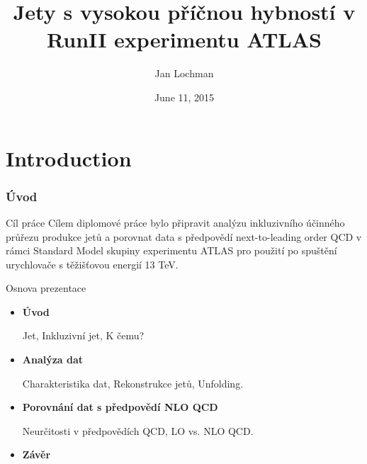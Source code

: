 \documentclass[compress]{beamer}
\title[High $\pt$ jets]{Jety s vysokou p\v{r}\'{i}\v{c}nou hybnost\'{i} v RunII
experimentu ATLAS}
\author{Jan Lochman}
\institute[FNSPE CTU] 
{
  Vedouc\'{i} pr\'{a}ce: Ing. Zden\v{e}k Hub\'{a}\v{c}ek, Ph.D.

  \medskip
  \medskip
  \medskip
  \large
  Obhajoba diplomov\'{e} pr\'{a}ce \\ 
  \medskip
}
\date{June 11, 2015}
\begin{document}

\begin{frame}
\titlepage 
\end{frame}

\section{Introduction}

\begin{frame}
\frametitle{\'{U}vod}
\begin{block}{C\'{i}l pr\'{a}ce}
  C\'{i}lem diplomov\'{e} pr\'{a}ce bylo p\v{r}ipravit anal\'{y}zu
  inkluzivn\'{i}ho
  \'{u}\v{c}inn\'{e}ho pr\r{u}\v{r}ezu
  produkce jet\r{u} a porovnat data s p\v{r}edpov\v{e}d\'{i} next-to-leading order
  QCD v r\'{a}mci
  Standard Model skupiny experimentu ATLAS pro pou\v{z}it\'{i} po
  spu\v{s}t\v{e}n\'{i} urychlova\v{c}e s
  t\v{e}\v{z}i\v{s}\v{t}ovou energi\'{i} 13 TeV.
\end{block}
\begin{block}{Osnova prezentace}
\begin{itemize}
  \item \textbf{\'{U}vod} 

    Jet, Inkluzivn\'{i} jet, K \v{c}emu?
  \item \textbf{Anal\'{y}za dat}

    Charakteristika dat, Rekonstrukce jet\r{u}, Unfolding.
  \item \textbf{Porovn\'{a}n\'{i} dat s p\v{r}edpov\v{e}d\'{i} NLO QCD}

    Neur\v{c}itosti v p\v{r}edpov\v{e}d\'{i}ch QCD, LO vs. NLO QCD.

  \item \textbf{Z\'{a}v\v{e}r}
\end{itemize}
\end{block}
\end{frame}
\end{document}
